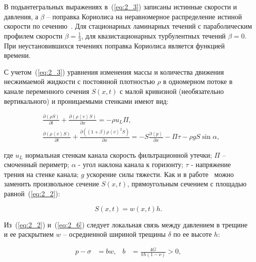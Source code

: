 В подынтегральных выражениях в~(\ref{eq:2_3}) записаны истинные скорости и давления, а $\beta$ – поправка Кориолиса на неравномерное распределение истиной скорости по сечению~\cite{Charniy1}. Для стационарных ламинарных течений с параболическим профилем скорости $\beta = \frac{1}{3}$, для квазистационарных турбулентных течений $\beta = 0$. При неустановившихся течениях поправка Кориолиса является функцией времени.



С учетом~(\ref{eq:2_3}) уравнения изменения массы и количества движения несжимаемой жидкости с постоянной плотностью $\rho$ в одномерном потоке в канале переменного сечения $S\left(x,t\right)$ с малой кривизной (необязательно вертикального) и проницаемыми стенками имеют вид:

\begin{align}

& \frac{\partial \left(\rho S\right)}{\partial t} + \frac{\partial \left(\rho \left\langle v\right\rangle  S\right)}{\partial x} = - \rho u_L \Pi, \label{eq:2_4} \\

& \frac{\partial \left(\rho \left\langle v\right\rangle  S\right)}{\partial t} + \frac{\partial \left(\left(1+\beta\right) \rho \left\langle v\right\rangle^2 S\right)}{\partial x} = 

-S \frac{\partial \left\langle p\right\rangle}{\partial x} - \Pi \tau - \rho g S \sin \alpha, \label{eq:2_5}

\end{align}

где $u_L$ нормальная стенкам канала скорость фильтрационной утечки; $\Pi$ – смоченный периметр; $\alpha$ - угол наклона канала к горизонту; $\tau$ - напряжение трения на стенке канала; $g$ ускорение силы тяжести. Как и в работе~\cite{Iv_Sm1} можно заменить произвольное сечение $S\left(x,t\right)$, прямоугольным сечением с площадью равной~(\ref{eq:2_2}):

\begin{equation}

S\left(x,t\right) = w\left(x,t\right)h .\label{eq:2_6}

\end{equation}



Из~(\ref{eq:2_2}) и~(\ref{eq:2_6}) следует локальная связь между давлением в трещине и ее раскрытием $w$ – осредненной шириной трещины $\delta$ по ее высоте $h$:

\begin{align}

p - \sigma &= bw, & b & = \frac{4G}{\pi h \left(1-\nu\right)} >0, \label{eq:2_7}

\end{align}

